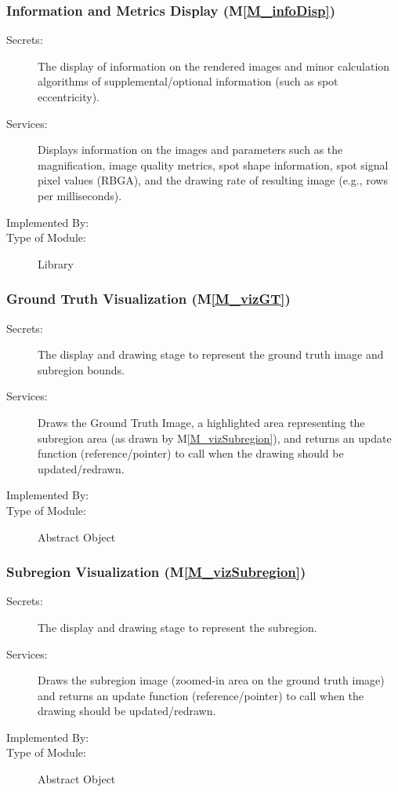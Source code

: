 \documentclass[12pt, titlepage]{article}
\newcommand{\mref}[1]{M\ref{#1}}
\begin{document}
\subsubsection{Information and Metrics Display (\mref{M_infoDisp})}
\begin{description}
\item[Secrets:] The display of information on the rendered
  images and minor calculation algorithms of supplemental/optional information (such as spot eccentricity).
\item[Services:] Displays information on the images and parameters such as the magnification,
  image quality metrics, spot shape information, spot signal pixel values (RBGA),
  and the drawing rate of resulting image (e.g., rows per milliseconds).
\item[Implemented By:] \progname{}
\item[Type of Module:] Library
\end{description}


\subsubsection{Ground Truth Visualization (\mref{M_vizGT})}
\begin{description}
\item[Secrets:] The display and drawing stage to represent the ground truth image and subregion bounds.
\item[Services:] Draws the Ground Truth Image, a highlighted area representing the subregion
  area (as drawn by \mref{M_vizSubregion}), and returns an update function (reference/pointer)
  to call when the drawing should be updated/redrawn.
\item[Implemented By:] \progname{}
\item[Type of Module:] Abstract Object
\end{description}


\subsubsection{Subregion Visualization (\mref{M_vizSubregion})}
\begin{description}
\item[Secrets:] The display and drawing stage to represent the subregion.
\item[Services:] Draws the subregion image (zoomed-in area on the ground truth image) 
  and returns an update function (reference/pointer) to call when the drawing should 
  be updated/redrawn.
\item[Implemented By:] \progname{}
\item[Type of Module:] Abstract Object
\end{description}
\end{document}
